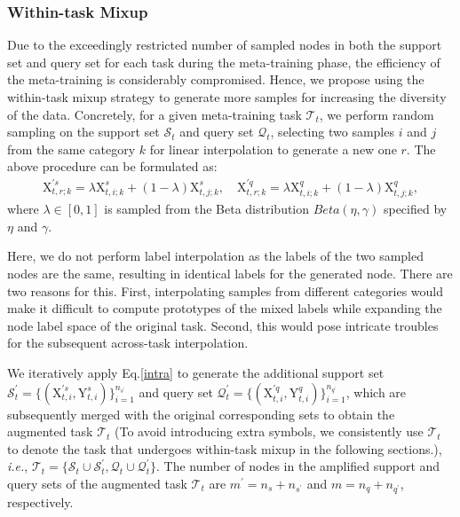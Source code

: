 \subsubsection{Within-task Mixup} 
Due to the exceedingly restricted number of sampled nodes in both the support set and query set for each task during the meta-training phase, the efficiency of the meta-training is considerably compromised. Hence, we propose using the within-task mixup strategy to generate more samples for increasing the diversity of the data. Concretely, for a given meta-training task $\mathcal{T}_t$, we perform random sampling on the support set $\mathcal{S}_t$ and query set $\mathcal{Q}_t$, selecting two samples $i$ and $j$ from the same category $k$ for linear interpolation to generate a new one $r$. The above procedure can be formulated as:
\begin{equation}
    \label{intra}
    \begin{aligned}
        \mathrm{X}_{t,r;k}^{\prime s}\!=\!\lambda\mathrm{X}_{t,i;k}^s\!+\! (1\!-\!\lambda)\mathrm{X}_{t,j;k}^s, \quad     \mathrm{X}_{t,r;k}^{\prime q}\!=\!\lambda\mathrm{X}_{t,i;k}^q\!+\! (1\!-\!\lambda)\mathrm{X}_{t,j;k}^q,
    \end{aligned}
\end{equation}
where $\lambda\!\in\![0,1]$ is sampled from the Beta distribution $Beta(\eta,\gamma)$ specified by $\eta$ and $\gamma$.%

Here, we do not perform label interpolation as the labels of the two sampled nodes are the same, resulting in identical labels for the generated node. There are two reasons for this. First, interpolating samples from different categories would make it difficult to compute prototypes of the mixed labels while expanding the node label space of the original task. Second, this would pose intricate troubles for the subsequent across-task interpolation.

We iteratively apply Eq.\ref{intra} to generate the additional support set $\mathcal{S}_t^\prime\!=\!\{(\mathrm{X}_{t,i}^{\prime s},\mathrm{Y}_{t,i}^s)\}_{i=1}^{n_{s^\prime}}$ and query set $\mathcal{Q}_t^\prime\!=\!\{(\mathrm{X}_{t,i}^{\prime q},\mathrm{Y}_{t,i}^q)\}_{i=1}^{n_{q^\prime}}$, which are subsequently merged with the original corresponding sets to obtain the augmented task $\mathcal{T}_t$ (To avoid introducing extra symbols, we consistently use $\mathcal{T}_t$ to denote the task that undergoes within-task mixup in the following sections.), \textit{i.e.}, $\mathcal{T}_t\!=\!\{\mathcal{S}_t\!\cup\!\mathcal{S}_t^\prime,\mathcal{Q}_t\!\cup\!\mathcal{Q}_t^\prime\}$. The number of nodes in the amplified support and query sets of the augmented task $\mathcal{T}_t$ are $m^\prime\!=\!n_s\!+\!n_{s^\prime}$ and $m\!=\!n_q\!+\!n_{q^\prime}$, respectively.

